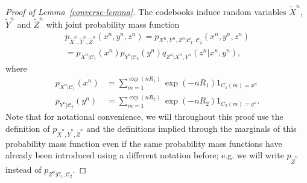 \documentclass[journal]{IEEEtran}
\newcommand{\channelpmf}{q}
\newcommand{\codebookpmf}{p}
\newcommand{\codebookRateOne}{R_1}
\newcommand{\codebookRateTwo}{R_2}
\newcommand{\channelInOne}{X}
\newcommand{\channelInOneAlphElement}{x}
\newcommand{\channelInTwo}{Y}
\newcommand{\channelInTwoAlphElement}{y}
\newcommand{\channelOut}{Z}
\newcommand{\channelOutAlphElement}{z}
\newcommand{\codebookOne}{\mathcal{C}_1}
\newcommand{\codebookTwo}{\mathcal{C}_2}
\newcommand{\codebookOneWord}[1]{C_1(#1)}
\newcommand{\codebookTwoWord}[1]{C_2(#1)}
\newcommand{\codewordIndex}{m}
\newcommand{\codebookBlocklength}{n}
\newcommand{\indicator}[1]{1_{#1}}
\begin{document}
\begin{proof}[Proof of Lemma~\ref{converse-lemma}]
The codebooks induce random variables $\tilde{\channelInOne}^\codebookBlocklength$, $\tilde{\channelInTwo}^\codebookBlocklength$ and $\tilde{\channelOut}^\codebookBlocklength$ with joint probability mass function
\begin{multline*}
\codebookpmf_{\tilde{\channelInOne}^\codebookBlocklength, \tilde{\channelInTwo}^\codebookBlocklength, \tilde{\channelOut}^\codebookBlocklength}(\channelInOneAlphElement^\codebookBlocklength, \channelInTwoAlphElement^\codebookBlocklength, \channelOutAlphElement^\codebookBlocklength)
=
\codebookpmf_{\channelInOne^\codebookBlocklength, \channelInTwo^\codebookBlocklength, \channelOut^\codebookBlocklength | \codebookOne, \codebookTwo}(\channelInOneAlphElement^\codebookBlocklength, \channelInTwoAlphElement^\codebookBlocklength, \channelOutAlphElement^\codebookBlocklength)
\\
=
\codebookpmf_{\channelInOne^\codebookBlocklength | \codebookOne}(\channelInOneAlphElement^\codebookBlocklength)
\codebookpmf_{\channelInTwo^\codebookBlocklength | \codebookTwo}(\channelInTwoAlphElement^\codebookBlocklength)
\channelpmf_{\channelOut^\codebookBlocklength | \channelInOne^\codebookBlocklength, \channelInTwo^\codebookBlocklength}(\channelOutAlphElement^\codebookBlocklength | \channelInOneAlphElement^\codebookBlocklength, \channelInTwoAlphElement^\codebookBlocklength),
\end{multline*}
where
\begin{align*}
\codebookpmf_{\channelInOne^\codebookBlocklength | \codebookOne}(\channelInOneAlphElement^\codebookBlocklength)
&=
\sum\limits_{\codewordIndex=1}^{\exp(\codebookBlocklength\codebookRateOne)}
  \exp(-\codebookBlocklength\codebookRateOne)
  \indicator{\codebookOneWord{\codewordIndex} = \channelInOneAlphElement^\codebookBlocklength}
\\
\codebookpmf_{\channelInTwo^\codebookBlocklength | \codebookTwo}(\channelInTwoAlphElement^\codebookBlocklength)
&=
\sum\limits_{\codewordIndex=1}^{\exp(\codebookBlocklength\codebookRateTwo)}
  \exp(-\codebookBlocklength\codebookRateTwo)
  \indicator{\codebookTwoWord{\codewordIndex} = \channelInTwoAlphElement^\codebookBlocklength}.
\end{align*}
Note that for notational convenience, we will throughout this proof use the definition of $\codebookpmf_{\tilde{\channelInOne}^\codebookBlocklength, \tilde{\channelInTwo}^\codebookBlocklength, \tilde{\channelOut}^\codebookBlocklength}$ and the definitions implied through the marginals of this probability mass function even if the same probability mass functions have already been introduced using a different notation before; e.g. we will write $\codebookpmf_{\tilde{\channelOut}^\codebookBlocklength}$ instead of $\codebookpmf_{\channelOut^\codebookBlocklength | \codebookOne, \codebookTwo}$.


\end{proof}
\end{document}
